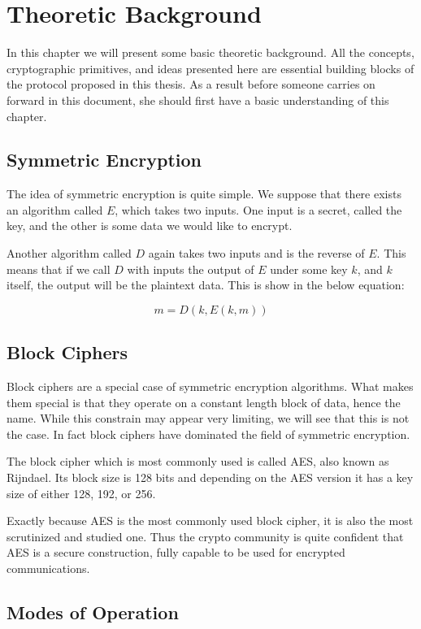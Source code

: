 \chapter{Theoretic Background}
\label{chapters:TheoreticBackground}

In this chapter we will present some basic theoretic background.
All the concepts, cryptographic primitives, and ideas presented here are essential building blocks of the protocol proposed in this thesis.
As a result before someone carries on forward in this document, she should first have a basic understanding of this chapter.

\section{Symmetric Encryption}

The idea of symmetric encryption is quite simple.
We suppose that there exists an algorithm called $E$, which takes two inputs.
One input is a secret, called the key, and the other is some data we would like to encrypt.

Another algorithm called $D$ again takes two inputs and is the reverse of $E$.
This means that if we call $D$ with inputs the output of $E$ under some key $k$, and $k$ itself, the output will be the plaintext data. This is show in the below equation:

\[
  m = D(k, E(k, m))
\]

\section{Block Ciphers}

Block ciphers are a special case of symmetric encryption algorithms.
What makes them special is that they operate on a constant length block of data, hence the name.
While this constrain may appear very limiting, we will see that this is not the case.
In fact block ciphers have dominated the field of symmetric encryption.

The block cipher which is most commonly used is called AES, also known as Rijndael.
Its block size is 128 bits and depending on the AES version it has a key size of either 128, 192, or 256.

Exactly because AES is the most commonly used block cipher, it is also the most scrutinized and studied one.
Thus the crypto community is quite confident that AES is a secure construction, fully capable to be used for encrypted communications.

\section{Modes of Operation}

